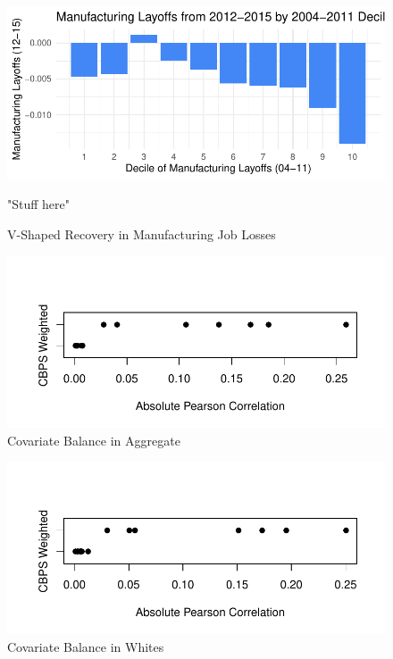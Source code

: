 \documentclass[]{AEA}
\begin{document}
\begin{figure} \label{vShapePlot}
\caption{V-Shaped Recovery in Manufacturing Job Losses}

\begin{center}\includegraphics{Final-Draft_files/figure-latex/unnamed-chunk-11-1} \end{center}



\FloatBarrier

\begin{figurenotes}
"Stuff here"
\end{figurenotes}
\end{figure}

\begin{figure} \label{balPlot}
\caption{Covariate Balance in Aggregate}


\begin{center}\includegraphics{Final-Draft_files/figure-latex/unnamed-chunk-12-1} \end{center}



\FloatBarrier

\end{figure}

\begin{figure} \label{balPlotWhite}
\caption{Covariate Balance in Whites}


\begin{center}\includegraphics{Final-Draft_files/figure-latex/unnamed-chunk-13-1} \end{center}



\FloatBarrier

\end{figure}
\end{document}
